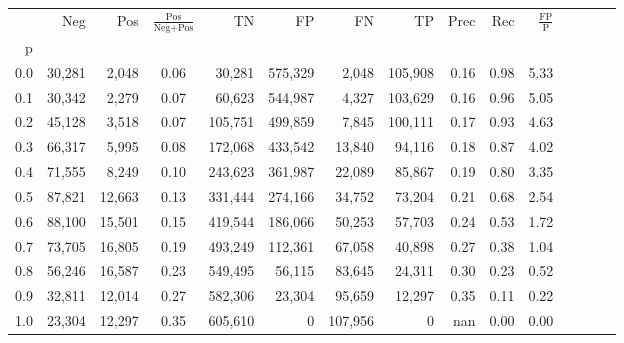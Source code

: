 \begin{tabular}{rrrcrrrrrrrrrrr}
\toprule
{} &     Neg &     Pos & $\frac{\text{Pos}}{\text{Neg}+\text{Pos}}$ &       TN &       FP &       FN &       TP &  Prec &   Rec & $\frac{\text{FP}}{\text{P}}$ \\
p   &         &         &                                            &          &          &          &          &       &       &                              \\
\midrule
0.0 &  30,281 &   2,048 &                                       0.06 &   30,281 &  575,329 &    2,048 &  105,908 &  0.16 &  0.98 &                         5.33 \\
0.1 &  30,342 &   2,279 &                                       0.07 &   60,623 &  544,987 &    4,327 &  103,629 &  0.16 &  0.96 &                         5.05 \\
0.2 &  45,128 &   3,518 &                                       0.07 &  105,751 &  499,859 &    7,845 &  100,111 &  0.17 &  0.93 &                         4.63 \\
0.3 &  66,317 &   5,995 &                                       0.08 &  172,068 &  433,542 &   13,840 &   94,116 &  0.18 &  0.87 &                         4.02 \\
0.4 &  71,555 &   8,249 &                                       0.10 &  243,623 &  361,987 &   22,089 &   85,867 &  0.19 &  0.80 &                         3.35 \\
0.5 &  87,821 &  12,663 &                                       0.13 &  331,444 &  274,166 &   34,752 &   73,204 &  0.21 &  0.68 &                         2.54 \\
0.6 &  88,100 &  15,501 &                                       0.15 &  419,544 &  186,066 &   50,253 &   57,703 &  0.24 &  0.53 &                         1.72 \\
0.7 &  73,705 &  16,805 &                                       0.19 &  493,249 &  112,361 &   67,058 &   40,898 &  0.27 &  0.38 &                         1.04 \\
0.8 &  56,246 &  16,587 &                                       0.23 &  549,495 &   56,115 &   83,645 &   24,311 &  0.30 &  0.23 &                         0.52 \\
0.9 &  32,811 &  12,014 &                                       0.27 &  582,306 &   23,304 &   95,659 &   12,297 &  0.35 &  0.11 &                         0.22 \\
1.0 &  23,304 &  12,297 &                                       0.35 &  605,610 &        0 &  107,956 &        0 &   nan &  0.00 &                         0.00 \\
\bottomrule
\end{tabular}
